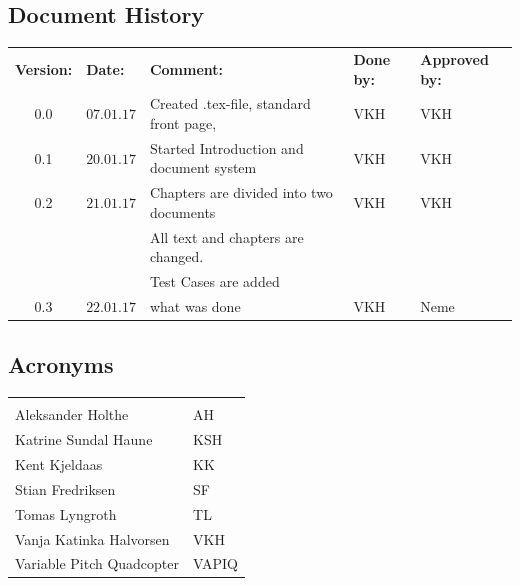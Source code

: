\documentclass{article}
\begin{document}
\begin{center}
\section*{\textbf{Document History}}
\begin{tabular}{cllll}
\rowcolor{cadetgrey}
\textbf{Version:}    &\textbf{Date:} 	 &\textbf{Comment:}    &\textbf{Done by:}   &\textbf{Approved by:}  \\

0.0       & $07.01.17$   & Created .tex-file, standard front page, & VKH  & VKH \\
 \rowcolor{gainsboro}
0.1       & $20.01.17$   & Started Introduction and document system  & VKH    & VKH \\

0.2       & $21.01.17$   & Chapters are divided into two documents & VKH    & VKH   \\
          &              & All text and chapters are changed.       &       &\\
          &              & Test Cases are added                     &       & \\
\rowcolor{gainsboro}
0.3       & $22.01.17$   & what was done  & VKH    & Neme          \\
\end{tabular}                                                                   
\end{center}

\vspace*{3.0 cm}

\begin{center}
\section*{\textbf{Acronyms}}
\begin{tabular}{ll}
\rowcolor{cadetgrey}
    &   \\
Aleksander Holthe      & AH     
 \\\rowcolor{gainsboro}
Katrine Sundal Haune  & KSH \\
Kent Kjeldaas         & KK 
 \\\rowcolor{gainsboro}
Stian Fredriksen      & SF  \\
Tomas Lyngroth       & TL   
 \\\rowcolor{gainsboro}
Vanja Katinka Halvorsen     & VKH   \\
Variable Pitch Quadcopter   & VAPIQ
\end{tabular}                                                             
\end{center}
\end{document}
